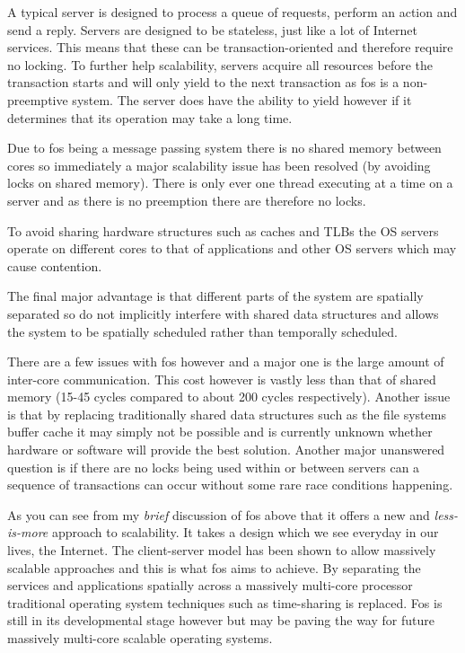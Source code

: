 \documentclass[journal]{IEEEtran}
\begin{document}
A typical server is designed to process a queue of requests, perform an action and send a reply. Servers are designed to be stateless, just like a lot of Internet services. This means that these can be transaction-oriented and therefore require no locking. To further help scalability, servers acquire all resources before the transaction starts and will only yield to the next transaction as fos is a non-preemptive system. The server does have the ability to yield however if it determines that its operation may take a long time.

Due to fos being a message passing system there is no shared memory between cores so immediately a major scalability issue has been resolved (by avoiding locks on shared memory). There is only ever one thread executing at a time on a server and as there is no preemption there are therefore no locks. 

To avoid sharing hardware structures such as caches and TLBs the OS servers operate on different cores to that of applications and other OS servers which may cause contention. 

The final major advantage is that different parts of the system are spatially separated so do not implicitly interfere with shared data structures and allows the system to be spatially scheduled rather than temporally scheduled.  

There are a few issues with fos however and a major one is the large amount of inter-core communication. This cost however is vastly less than that of shared memory (15-45 cycles compared to about 200 cycles respectively). Another issue is that by replacing traditionally shared data structures such as the file systems buffer cache it may simply not be possible and is currently unknown whether hardware or software will provide the best solution. Another major unanswered question is if there are no locks being used within or between servers can a sequence of transactions can occur without some rare race conditions happening.

As you can see from my \emph{brief} discussion of fos above that it offers a new and \emph{less-is-more} approach to scalability. It takes a design which we see everyday in our lives, the Internet. The client-server model has been shown to allow massively scalable approaches and this is what fos aims to achieve. By separating the services and applications spatially across a massively multi-core processor traditional operating system techniques such as time-sharing is replaced. Fos is still in its developmental stage however but may be paving the way for future massively multi-core scalable operating systems.
\end{document}
